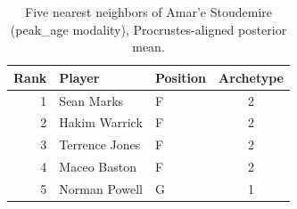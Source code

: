 \begin{table}[htbp]
  \centering\small
  \begin{tabular}{rllc}
    \toprule
    Rank & Player & Position & Archetype \\
    \midrule
    1 & Sean Marks & F & 2 \\
    2 & Hakim Warrick & F & 2 \\
    3 & Terrence Jones & F & 2 \\
    4 & Maceo Baston & F & 2 \\
    5 & Norman Powell & G & 1 \\
    \bottomrule
  \end{tabular}
  \caption{Five nearest neighbors of Amar'e Stoudemire (peak_age modality), Procrustes-aligned posterior mean.}
  \label{tab:Amar_e_Stoudemire_neighbors_peak_age}
\end{table}

